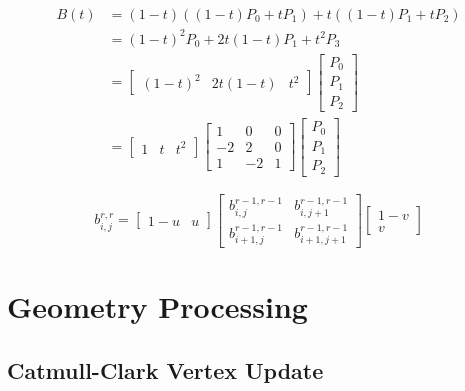\documentclass[10pt,landscape]{article}
\begin{document}
\begin{multicols}{3}

\begin{align*}
    B(t) &= (1-t)((1-t)P_0 + tP_1) + t((1-t)P_1 + tP_2) \\
    &= (1-t)^2 P_0 + 2t(1-t)P_1 + t^2 P_3 \\
    &=  \begin{bmatrix}
            (1-t)^2 & 2t(1-t) & t^2
        \end{bmatrix}
        \begin{bmatrix}
            P_0 \\
            P_1 \\
            P_2
        \end{bmatrix} \\
    &=  \begin{bmatrix}
            1 & t & t^2
        \end{bmatrix}
        \begin{bmatrix}
            1 & 0 & 0 \\
            -2 & 2 & 0 \\
            1 & -2 & 1
        \end{bmatrix}
        \begin{bmatrix}
            P_0 \\
            P_1 \\
            P_2
        \end{bmatrix}
\end{align*}

$$b_{i,j}^{r,r} =
\begin{bmatrix}
    1 - u & u
\end{bmatrix}
\begin{bmatrix}
    b_{i, j}^{r-1, r-1} & b_{i, j+1}^{r-1, r-1} \\
    b_{i+1, j}^{r-1, r-1} & b_{i+1, j+1}^{r-1, r-1}
\end{bmatrix}
\begin{bmatrix}
    1 - v \\
    v
\end{bmatrix}$$


\section{Geometry Processing}

\subsection{Catmull-Clark Vertex Update}


\end{multicols}
\end{document}
